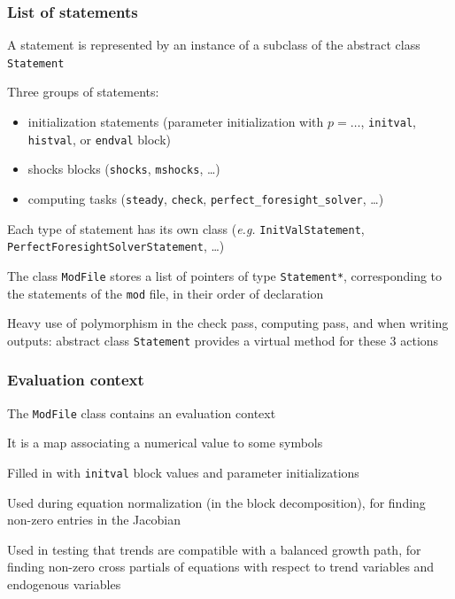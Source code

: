\documentclass[aspectratio=169]{beamer}
\newenvironment{witemize}{\itemize\addtolength{\itemsep}{8pt}}{\enditemize}
\begin{document}
\begin{frame}
  \frametitle{List of statements}
  \begin{witemize}
  \item A statement is represented by an instance of a subclass of the abstract class \texttt{Statement}
  \item Three groups of statements:
    \begin{itemize}
    \item initialization statements (parameter initialization with $p = \ldots$, \texttt{initval}, \texttt{histval}, or \texttt{endval} block)
    \item shocks blocks (\texttt{shocks}, \texttt{mshocks}, \ldots)
    \item computing tasks (\texttt{steady}, \texttt{check}, \texttt{perfect\_foresight\_solver}, \ldots)
    \end{itemize}
  \item Each type of statement has its own class (\textit{e.g.} \texttt{InitValStatement}, \texttt{PerfectForesightSolverStatement}, \ldots)
  \item The class \texttt{ModFile} stores a list of pointers of type \texttt{Statement*}, corresponding to the statements of the \texttt{mod} file, in their order of declaration
  \item Heavy use of polymorphism in the check pass, computing pass, and when writing outputs: abstract class \texttt{Statement} provides a virtual method for these 3 actions
  \end{witemize}
\end{frame}

\begin{frame}
  \frametitle{Evaluation context}
  \begin{witemize}
  \item The \texttt{ModFile} class contains an \alert{evaluation context}
  \item It is a map associating a numerical value to some symbols
  \item Filled in with \texttt{initval} block values and parameter initializations
  \item Used during equation normalization (in the block decomposition), for finding non-zero entries in the Jacobian
  \item Used in testing that trends are compatible with a balanced growth path, for finding non-zero cross partials of equations with respect to trend variables and endogenous variables
  \end{witemize}
\end{frame}
\end{document}
